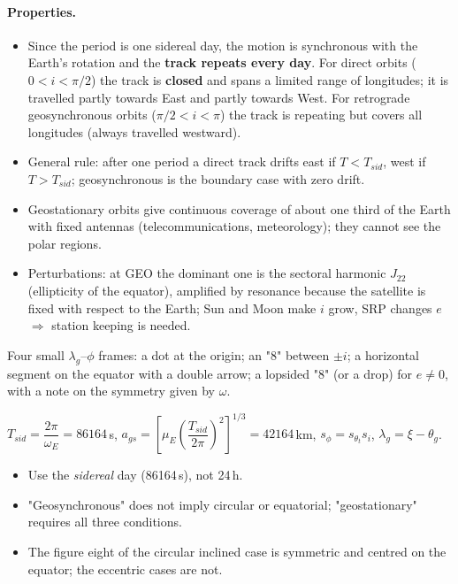 \paragraph{Properties.}
\begin{itemize}
\item Since the period is one sidereal day, the motion is synchronous with the Earth's rotation and the \textbf{track repeats
every day}. For direct orbits ($0<i<\pi/2$) the track is \textbf{closed} and spans a limited range of longitudes; it is travelled
partly towards East and partly towards West. For retrograde geosynchronous orbits ($\pi/2<i<\pi$) the track is repeating
but covers all longitudes (always travelled westward).
\item General rule: after one period a direct track drifts east if $T<T_{sid}$, west if $T>T_{sid}$; geosynchronous is the
boundary case with zero drift.
\item Geostationary orbits give continuous coverage of about one third of the Earth with fixed antennas
(telecommunications, meteorology); they cannot see the polar regions.
\item Perturbations: at GEO the dominant one is the sectoral harmonic $J_{22}$ (ellipticity of the equator), amplified by
resonance because the satellite is fixed with respect to the Earth; Sun and Moon make $i$ grow, SRP changes $e$
$\Rightarrow$ station keeping is needed.
\end{itemize}

\begin{fig2draw}
Four small $\lambda_g$--$\phi$ frames: a dot at the origin; an "8" between $\pm i$; a horizontal segment on the equator with a
double arrow; a lopsided "8" (or a drop) for $e\neq0$, with a note on the symmetry given by $\omega$.
\end{fig2draw}

\begin{keyf}
$T_{sid}=\dfrac{2\pi}{\omega_E}=86164$\,s, \quad $a_{gs}=\left[\mu_E\left(\dfrac{T_{sid}}{2\pi}\right)^2\right]^{1/3}=42164$\,km,
\quad $s_\phi=s_{\theta_t}s_i$, \quad $\lambda_g=\xi-\theta_g$.
\end{keyf}

\pitfalls
\begin{itemize}
\item Use the \emph{sidereal} day (86164\,s), not 24\,h.
\item "Geosynchronous" does not imply circular or equatorial; "geostationary" requires all three conditions.
\item The figure eight of the circular inclined case is symmetric and centred on the equator; the eccentric cases are not.
\end{itemize}

